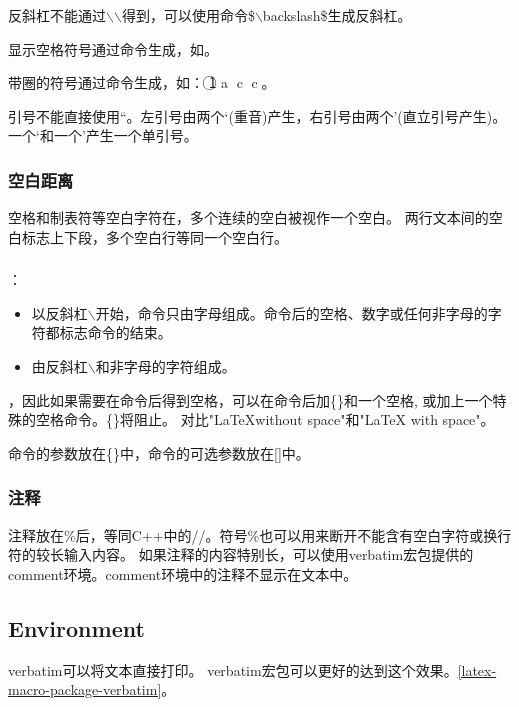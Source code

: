 反斜杠不能通过$\backslash$$\backslash$得到，可以使用命令\$$\backslash$backslash\$生成反斜杠。

显示空格符号通过命令生成，如\textvisiblespace。

带圈的符号通过命令生成，如：
\textcircled{\scriptsize 1}
\textcircled{\scriptsize a}
\textcircled{\scriptsize c}
\textcircled{c}。

引号不能直接使用“。左引号由两个`(重音)产生，右引号由两个'(直立引号产生)。一个`和一个'产生一个单引号。

\subsubsection{空白距离}
空格和制表符等空白字符在，多个连续的空白被视作一个空白。
两行文本间的空白标志上下段，多个空白行等同一个空白行。

\subsubsection{}
：
\begin{itemize}
\item 以反斜杠$\backslash$开始，命令只由字母组成。命令后的空格、数字或任何非字母的字符都标志命令的结束。
\item 由反斜杠$\backslash$和非字母的字符组成。
\end{itemize}
，因此如果需要在命令后得到空格，可以在命令后加\{\}和一个空格,
或加上一个特殊的空格命令。\{\}将阻止。
对比"\LaTeX without space"和"\LaTeX{} with space"。

命令的参数放在\{\}中，命令的可选参数放在[]中。

\subsubsection{注释}
注释放在\%后，等同C++中的//。符号\%也可以用来断开不能含有空白字符或换行符的较长输入内容。
如果注释的内容特别长，可以使用verbatim宏包提供的comment环境。comment环境中的注释不显示在文本中。


\subsection{Environment}

verbatim可以将文本直接打印。
verbatim宏包可以更好的达到这个效果。\ref{latex-macro-package-verbatim}。

